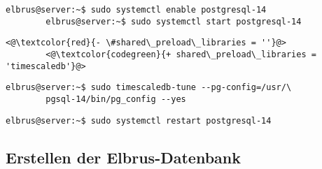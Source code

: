 	\lstset{style=commands}
	\begin{lstlisting}[caption={Verknüpfen von 'postgresql' Serive Start mit Serverstart sowie den Service starten.}]
		elbrus@server:~$ sudo systemctl enable postgresql-14
		elbrus@server:~$ sudo systemctl start postgresql-14
	\end{lstlisting}
	
	\lstset{style=files}
	\begin{lstlisting}[caption={/var/lib/pgsql/14/data/postgresql.conf - Ändern der folgenden Zeilen.}, numbers=none]
		<@\textcolor{red}{- \#shared\_preload\_libraries = ''}@>
		<@\textcolor{codegreen}{+ shared\_preload\_libraries = 'timescaledb'}@>
	\end{lstlisting}
	
	
	
	\lstset{style=commands}
	\begin{lstlisting}[caption={Anpassen der Datenbank Einstellungen auf die Server Hardware.}]
		elbrus@server:~$ sudo timescaledb-tune --pg-config=/usr/\
		pgsql-14/bin/pg_config --yes
	\end{lstlisting}
	
	\lstset{style=commands}
	\begin{lstlisting}[caption={Neustarten des Services um Änderungen zu übernehmen.}]
		elbrus@server:~$ sudo systemctl restart postgresql-14
	\end{lstlisting}
	\newpage
	
	\subsection{Erstellen der Elbrus-Datenbank}
	
